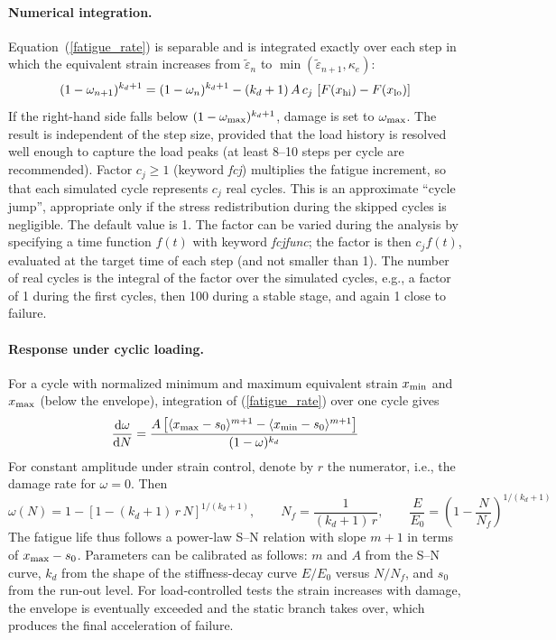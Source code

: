 \documentclass[a4paper]{article}
\begin{document}
\paragraph{Numerical integration.}
Equation~(\ref{fatigue_rate}) is separable and is integrated exactly over each step in which the equivalent strain
increases from $\tilde\varepsilon_n$ to $\min(\tilde\varepsilon_{n+1},\kappa_e)$:
$$
(1-\omega_{n+1})^{k_d+1}=(1-\omega_n)^{k_d+1}-(k_d+1)\,A\,c_j\,\left[F(x_{\rm hi})-F(x_{\rm lo})\right]
$$
If the right-hand side falls below $(1-\omega_{\rm max})^{k_d+1}$, damage is set to $\omega_{\rm max}$.
The result is independent of the step size, provided that the load history is resolved
well enough to capture the load peaks (at least 8--10 steps per cycle are recommended).
Factor $c_j\ge 1$ (keyword {\it fcj}) multiplies the fatigue increment, so that each simulated cycle
represents $c_j$ real cycles. This is an approximate ``cycle jump'', appropriate only if the stress
redistribution during the skipped cycles is negligible. The default value is 1.
The factor can be varied during the analysis by specifying a time function $f(t)$ with keyword {\it fcjfunc}; the factor is
then $c_jf(t)$, evaluated at the target time of each step (and not smaller than 1). The number of real cycles is the integral of the factor
over the simulated cycles, e.g., a factor of 1 during the first cycles, then 100 during a stable stage, and again 1 close to failure.

\paragraph{Response under cyclic loading.}
For a cycle with normalized minimum and maximum equivalent strain $x_{\rm min}$ and $x_{\rm max}$
(below the envelope), integration of (\ref{fatigue_rate}) over one cycle gives
$$
\frac{{\rm d}\omega}{{\rm d}N}=\frac{A\left[\langle x_{\rm max}-s_0\rangle^{m+1}-\langle x_{\rm min}-s_0\rangle^{m+1}\right]}{(1-\omega)^{k_d}}
$$
For constant amplitude under strain control, denote by $r$ the numerator, i.e., the damage rate for $\omega=0$. Then
$$
\omega(N)=1-\left[1-(k_d+1)\,r\,N\right]^{1/(k_d+1)},\qquad
N_f=\frac{1}{(k_d+1)\,r},\qquad
\frac{E}{E_0}=\left(1-\frac{N}{N_f}\right)^{1/(k_d+1)}
$$
The fatigue life thus follows a power-law S--N relation with slope $m+1$ in terms of $x_{\rm max}-s_0$.
Parameters can be calibrated as follows: $m$ and $A$ from the S--N curve, $k_d$ from the
shape of the stiffness-decay curve $E/E_0$ versus $N/N_f$, and $s_0$ from the run-out level.
For load-controlled tests the strain increases with damage, the envelope is eventually exceeded and the
static branch takes over, which produces the final acceleration of failure.
\end{document}
